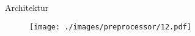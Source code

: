 \begin{frame}{Architektur}
    \begin{figure}
    	\centering
    	\texttt{[image: ./images/preprocessor/12.pdf]}
    \end{figure}
\end{frame}
